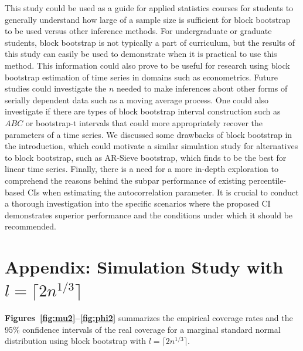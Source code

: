 \documentclass[10pt]{article}
\begin{document}
This study could be used as a guide for applied statistics courses for students
to generally understand how large of a sample size is sufficient for block
bootstrap to be used versus other inference methods. For undergraduate or 
graduate students, block bootstrap is not typically a part of curriculum, but
the results of this study can easily be used to demonstrate when it is practical 
to use this method. This information could also prove to be useful for research 
using block bootstrap estimation of time series in domains such as econometrics. 
Future studies could investigate the $n$ needed to make inferences about other 
forms of serially dependent data such as a moving average process. One could 
also investigate if there are types of block bootstrap interval construction 
such as $ABC$ or bootstrap-t intervals \citep{efron1993introduction} that could 
more
appropriately recover the parameters of a time series. We discussed some
drawbacks of block bootstrap in the introduction, which could motivate a similar
simulation study for alternatives to block bootstrap, such 
as AR-Sieve bootstrap, \citep{kreiss1992bootstrap} which 
\citet{buhlmann2002bootstraps} finds to be the best for linear time series.
Finally, there is a need for a more in-depth exploration to comprehend
the reasons behind the subpar performance of existing percentile-based
CIs when estimating the autocorrelation parameter. It is crucial to
conduct a thorough investigation into the specific scenarios where the
proposed CI demonstrates superior performance and the conditions under
which it should be recommended.


\section*{Appendix: Simulation Study with $l = \lceil 2n^{1/3} \rceil$}

\textbf{Figures~\ref{fig:mu2}--\ref{fig:phi2}} 
summarizes the empirical coverage rates and the 95\% confidence intervals of the 
real coverage for a marginal standard normal distribution using block bootstrap
with $l = \lceil 2n^{1/3} \rceil$.
\end{document}
